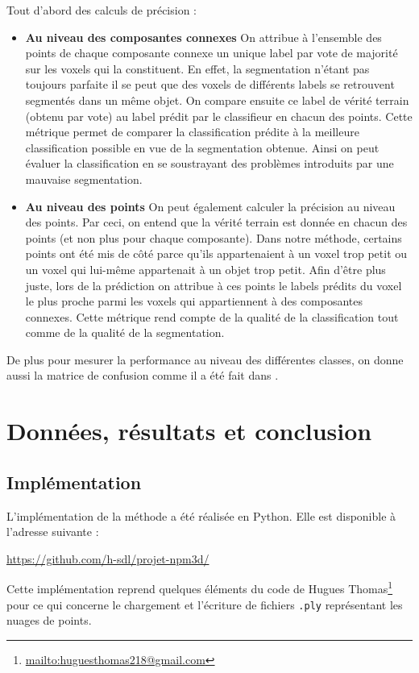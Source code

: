 \documentclass[a4paper, onecolumn, 11pt]{article}
\begin{document}
Tout d'abord des calculs de précision :
\begin{itemize}
\item \textbf{Au niveau des composantes connexes} On attribue à l'ensemble des points de chaque composante connexe un unique label par vote de majorité sur les voxels qui la constituent. En effet, la segmentation n'étant pas toujours parfaite il se peut que des voxels de différents labels se retrouvent segmentés dans un même objet. On compare ensuite ce label de vérité terrain (obtenu par vote) au label prédit par le classifieur en chacun des points. Cette métrique permet de comparer la classification prédite à la meilleure classification possible en vue de la segmentation obtenue. Ainsi on peut évaluer la classification en se soustrayant des problèmes introduits par une mauvaise segmentation.
\item \textbf{Au niveau des points} On peut également calculer la précision au niveau des points. Par ceci, on entend que la vérité terrain est donnée en chacun des points (et non plus pour chaque composante). Dans notre méthode, certains points ont été mis de côté parce qu'ils appartenaient à un voxel trop petit ou un voxel qui lui-même appartenait à un objet trop petit. Afin d'être plus juste, lors de la prédiction on attribue à ces points le labels prédits du voxel le plus proche parmi les voxels qui appartiennent à des composantes connexes. Cette métrique rend compte de la qualité de la classification tout comme de la qualité de la segmentation.
\end{itemize}
De plus pour mesurer la performance au niveau des différentes classes, on donne aussi la matrice de confusion comme il a été fait dans \cite{aka_article}.

\section{Données, résultats et conclusion}
\subsection{Implémentation}
L'implémentation de la méthode a été réalisée en Python. Elle est disponible à l'adresse suivante :

\begin{center}
	\url{https://github.com/h-sdl/projet-npm3d/} 
\end{center}

Cette implémentation reprend quelques éléments du code de Hugues Thomas\footnote{\url{mailto:huguesthomas218@gmail.com}} pour ce qui concerne le chargement et l'écriture de fichiers \texttt{.ply} représentant les nuages de points.
\end{document}
